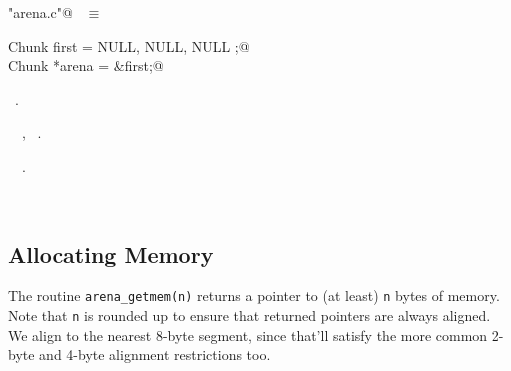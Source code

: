 \documentclass{report}
\begin{document}
\begin{flushleft} \small
\begin{minipage}{\linewidth} \label{scrap257}
\verb@"arena.c"@\nobreak\ {\footnotesize {} }$\equiv$
\vspace{-1ex}
\begin{list}{}{} \item
\mbox{}\verb@static Chunk first = { NULL, NULL, NULL };@\\
\mbox{}\verb@static Chunk *arena = &first;@\\
\mbox{}\verb@@{\NWsep}
\end{list}
\vspace{-1ex}
\footnotesize\addtolength{\baselineskip}{-1ex}
\begin{list}{}{\setlength{\itemsep}{-\parsep}\setlength{\itemindent}{-\leftmargin}}
\item \NWtxtFileDefBy\ .
\end{list}
\vspace{-2ex}
\footnotesize\addtolength{\baselineskip}{-1ex}
\begin{list}{}{\setlength{\itemsep}{-\parsep}\setlength{\itemindent}{-\leftmargin}}
\item \NWtxtIdentsDefed\nobreak\  \verb@arena@\nobreak\ , \verb@first@\nobreak\ .\end{list}
\vspace{-2ex}
\footnotesize\addtolength{\baselineskip}{-1ex}
\begin{list}{}{\setlength{\itemsep}{-\parsep}\setlength{\itemindent}{-\leftmargin}}
\item \NWtxtIdentsUsed\nobreak\  \verb@Chunk@\nobreak\ .\end{list}
\end{minipage}\\[4ex]
\end{flushleft}
\subsection{Allocating Memory}

The routine \verb|arena_getmem(n)| returns a pointer to (at least) 
\verb|n| bytes of memory. Note that \verb|n| is rounded up to ensure
that returned pointers are always aligned.  We align to the nearest
8-byte segment, since that'll satisfy the more common 2-byte and
4-byte alignment restrictions too.
\end{document}
